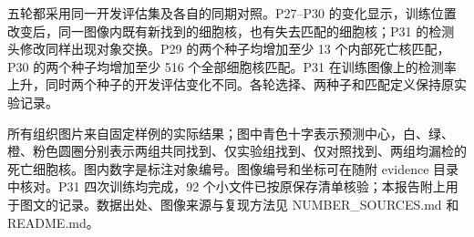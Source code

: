 \documentclass[
  11pt,
  fontset=fandol]{ctexart}
\begin{document}
五轮都采用同一开发评估集及各自的同期对照。P27--P30
的变化显示，训练位置改变后，同一图像内既有新找到的细胞核，也有失去匹配的细胞核；P31
的检测头修改同样出现对象交换。P29 的两个种子均增加至少 13
个内部死亡核匹配，P30 的两个种子均增加至少 516 个全部细胞核匹配。P31
在训练图像上的检测率上升，同时两个种子的开发评估变化不同。各轮选择、两种子和匹配定义保持原实验记录。

所有组织图片来自固定样例的实际结果；图中青色十字表示预测中心，白、绿、橙、粉色圆圈分别表示两组共同找到、仅实验组找到、仅对照找到、两组均漏检的死亡细胞核。图内数字是标注对象编号。图像编号和坐标可在随附
evidence 目录中核对。P31 四次训练均完成，92
个小文件已按原保存清单核验；本报告附上用于图文的记录。数据出处、图像来源与复现方法见
NUMBER\_SOURCES.md 和 README.md。
\end{document}
